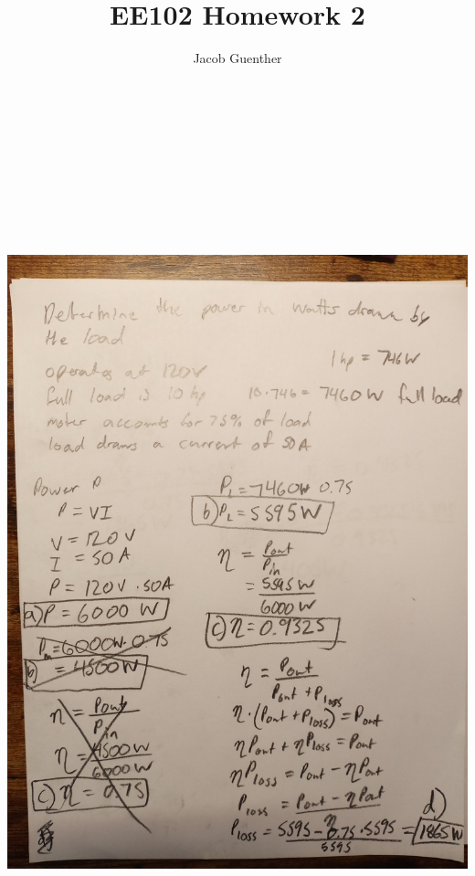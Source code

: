 \documentclass{article}
\title{EE102 Homework 2}
\author{Jacob Guenther}
\begin{document}


\newpage

\includegraphics[height=257mm, width=170mm]{Quiz_2_jacob_guenther}
\end{document}
